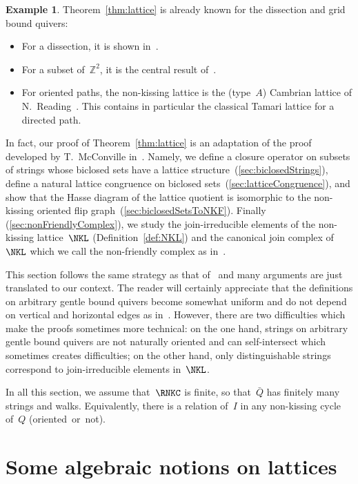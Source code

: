 \documentclass{memo-l}
\theoremstyle{definition}
\newtheorem{example}[theorem]{Example}
\newcommand{\Z}{\mathbb{Z}} %
\begin{document}
\begin{example}
Theorem~\ref{thm:lattice} is already known for the dissection and grid bound quivers:
\begin{itemize}
\item For a dissection, it is shown in~\cite{GarverMcConville}.
\item For a subset of~$\Z^2$,  it is the central result of~\cite{McConville}.
\item For oriented paths, the non-kissing lattice is the (type~$A$) Cambrian lattice of N.~Reading~\cite{Reading-CambrianLattices}. This contains in particular the classical Tamari lattice for a directed path.
\end{itemize}
\end{example}

In fact, our proof of Theorem~\ref{thm:lattice} is an adaptation of the proof  developed by T.~McConville in~\cite{McConville}.
Namely, we define a closure operator on subsets of strings whose biclosed sets have a lattice structure~(\ref{sec:biclosedStrings}), define a natural lattice congruence on biclosed sets~(\ref{sec:latticeCongruence}), and show that the Hasse diagram of the lattice quotient is isomorphic to the non-kissing oriented flip graph~(\ref{sec:biclosedSetsToNKF}).
Finally (\ref{sec:nonFriendlyComplex}), we study the join-irreducible elements of the non-kissing lattice~$\NKL$ (Definition~\ref{def:NKL}) and the canonical join complex of~$\NKL$ which we call the non-friendly complex as in~\cite{GarverMcConville-grid}.

This section follows the same strategy as that of~\cite{McConville, GarverMcConville-grid} and many arguments are just translated to our context.
The reader will certainly appreciate that the definitions on arbitrary gentle bound quivers become somewhat uniform and do not depend on vertical and horizontal edges as in~\cite{McConville}.
However, there are two difficulties which make the proofs sometimes more technical: on the one hand, strings on arbitrary gentle bound quivers are not naturally oriented and can self-intersect which sometimes creates difficulties; on the other hand, only distinguishable strings correspond to join-irreducible elements in~$\NKL$.

In all this section, we assume that~$\RNKC$ is finite, so that~$\bar Q$ has finitely many strings and walks.
Equivalently, there is a relation of~$I$ in any non-kissing cycle of~$Q$ (oriented~or~not).

\section{Some algebraic notions on lattices}
\label{sec:recollectionLattice}
\end{document}
